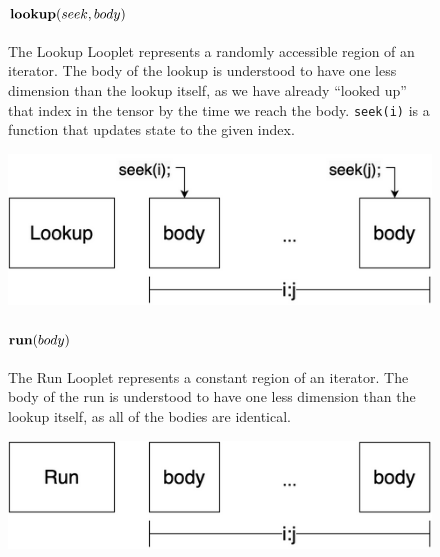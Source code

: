 \begin{figure}[ht]
    \begin{minipage}[c]{0.6\linewidth}
        \paragraph{$\text{\textbf{lookup}}(seek, body)$} The Lookup Looplet represents a
        randomly accessible region of an iterator. The body of the lookup is
        understood to have one less dimension than the lookup itself, as we have
        already ``looked up'' that index in the tensor by the time we reach the
        body. \texttt{seek(i)} is a function that updates state to the given
        index.
    \end{minipage}%
    \begin{minipage}[c]{0.4\linewidth}
        \centering
        \includegraphics[scale=0.25]{Looplets-lookup.png}
    \end{minipage}

    \begin{minipage}[c]{0.6\linewidth}
        \paragraph{$\text{\textbf{run}}(body)$} The Run Looplet represents a constant
        region of an iterator. The body of the run is understood to have one
        less dimension than the lookup itself, as all of the bodies are
        identical.
    \end{minipage}%
    \begin{minipage}[c]{0.4\linewidth}
        \centering
        \includegraphics[scale=0.25]{Looplets-run.png}
    \end{minipage}


\end{figure}
